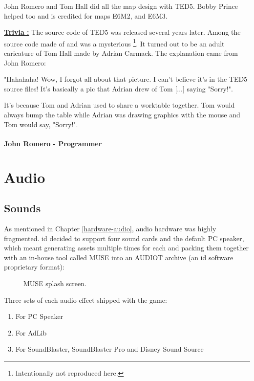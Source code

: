 \documentclass[book.tex]{subfiles}
\begin{document}
\par
John Romero and Tom Hall did all the map design with TED5. Bobby Prince helped too and is credited for maps E6M2, and E6M3.\\
\par
 \textbf{\underline{Trivia :}} The source code of TED5 was released several years later. Among the source code made of  and  was a mysterious \footnote{Intentionally not reproduced here.}. It turned out to be an adult caricature of Tom Hall made by Adrian Carmack. The explanation came from John Romero:\\%
\par
 \begin{fancyquotes}
   "Hahahaha! Wow, I forgot all about that picture. I can't believe it's 
in the TED5 source files! It's basically a pic that Adrian drew of Tom 
[...] saying "Sorry!".\\
\par 
It's because Tom and Adrian used to share a worktable together. Tom 
would always bump the table while Adrian was drawing graphics with the 
mouse and Tom would say, "Sorry!".\\
   \\
\textbf{John Romero - Programmer}
 \end{fancyquotes}











\section{Audio}

\subsection{Sounds}
As mentioned in Chapter \ref{hardware-audio}, audio hardware was highly fragmented. id decided to support four sound cards and the default PC speaker, which meant generating assets multiple times for each and packing them together with an in-house tool called MUSE into an AUDIOT archive (an id software proprietary format):\\
\begin{figure}[H]
\centering

  \caption{MUSE splash screen.}
 \end{figure}
 \par
 Three sets of each audio effect shipped with the game:
\begin{enumerate}
\item For PC Speaker
\item For AdLib
\item For SoundBlaster, SoundBlaster Pro and Disney Sound Source
\end{enumerate}
\end{document}
